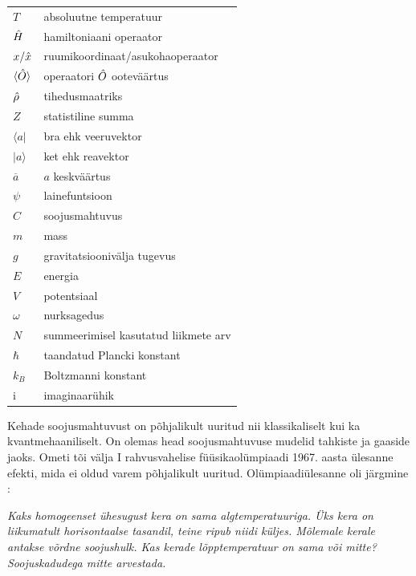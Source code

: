 \documentclass{trkut}%
\renewcommand\bra[1]{{\langle{#1}|}}
\renewcommand\ket[1]{{|{#1}\rangle}}
\renewcommand\braket[1]{\langle{#1}\rangle}
\begin{document}
\maketitle%
\tableofcontents%

\begin{tabular}{l l}
    $T$ & absoluutne temperatuur \\
    $\op{H}$ & hamiltoniaani operaator \\
    $x/\op{x}$ & ruumikoordinaat/asukohaoperaator \\
    $\braket{\op{O}}$ & operaatori $\op{O}$ ooteväärtus \\
    $\op{\rho}$ & tihedusmaatriks \\
    $Z$ & statistiline summa \\
    $\bra{a}$ & bra ehk veeruvektor \\
    $\ket{a}$ & ket ehk reavektor \\
    $\overline{a}$ & $a$ keskväärtus \\
    $\psi$ & lainefuntsioon \\
    $C$ & soojusmahtuvus \\
    $m$ & mass \\
    $g$ & gravitatsioonivälja tugevus \\
    $E$ & energia \\
    $V$ & potentsiaal \\
    $\omega$ & nurksagedus \\
    $N$ & summeerimisel kasutatud liikmete arv \\
    $\hbar$ & taandatud Plancki konstant \\
    $k_B$ & Boltzmanni konstant \\
    $\mathrm{i}$ & imaginaarühik \\
\end{tabular}


\nummerdame%
Kehade soojusmahtuvust on põhjalikult uuritud nii klassikaliselt kui ka kvantmehaaniliselt.
On olemas head soojusmahtuvuse mudelid tahkiste ja gaaside jaoks.
Ometi tõi välja I rahvusvahelise füüsikaolümpiaadi 1967. aasta ülesanne efekti, mida ei oldud varem põhjalikult uuritud.
Olümpiaadiülesanne oli järgmine \parencite[6]{ipho67}:

\textit{Kaks homogeenset ühesugust kera on sama algtemperatuuriga. Üks kera on liikumatult horisontaalse tasandil, teine ripub niidi küljes. Mõlemale kerale antakse võrdne soojushulk. Kas kerade lõpptemperatuur on sama või mitte? Soojuskadudega mitte arvestada.}
\end{document}
